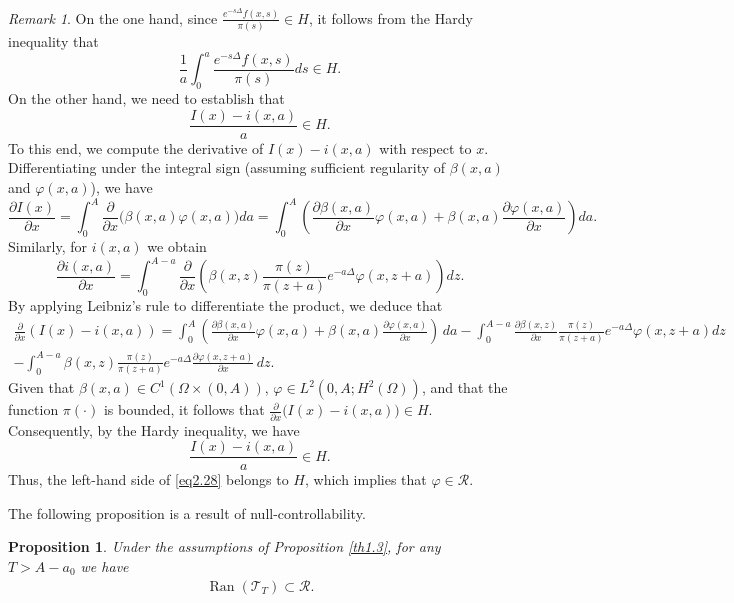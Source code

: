\documentclass[10pt, a4]{amsart}
\newcounter{assu}
\theoremstyle{plain}
\newtheorem{proposition}[lemma]{Proposition}
\theoremstyle{definition}
\theoremstyle{remark}
\newtheorem{remark}[lemma]{Remark}
\numberwithin{equation}{section}
\begin{document}
\begin{remark}
On the one hand, since \(\frac{e^{-s\Delta}f(x,s)}{\pi(s)} \in H\), it follows from the Hardy inequality \cite{ref43} that
\[
\frac{1}{a}\int_0^a \frac{e^{-s\Delta}f(x,s)}{\pi(s)}ds \in H.
\]
On the other hand, we need to establish that
\[
\frac{I(x)-i(x,a)}{a} \in H.
\]
To this end, we compute the derivative of \( I(x)-i(x,a) \) with respect to \(x\). Differentiating under the integral sign (assuming sufficient regularity of \(\beta(x,a)\) and \(\varphi(x,a)\)), we have
\[
\frac{\partial I(x)}{\partial x} = \int_0^A \frac{\partial}{\partial x}\bigl(\beta(x,a)\varphi(x,a)\bigr) da = \int_0^A \left(\frac{\partial \beta(x,a)}{\partial x}\varphi(x,a) + \beta(x,a)\frac{\partial \varphi(x,a)}{\partial x}\right) da.
\]
Similarly, for \( i(x,a) \) we obtain
\[
\frac{\partial i(x,a)}{\partial x} = \int_0^{A-a} \frac{\partial}{\partial x}\left(\beta(x,z)\frac{\pi(z)}{\pi(z+a)}e^{-a\Delta}\varphi(x,z+a)\right) dz.
\]
By applying Leibniz's rule to differentiate the product, we deduce that
\begin{align*}
    \frac{\partial}{\partial x} \left(I(x) - i(x, a)\right) = \int_{0}^{A} \left(\frac{\partial \beta(x, a)}{\partial x} \varphi(x, a) + \beta(x, a) \frac{\partial \varphi(x, a)}{\partial x}\right) \, da 
- \int_{0}^{A-a} \frac{\partial \beta(x, z)}{\partial x} \frac{\pi(z)}{\pi(z + a)} e^{-a\Delta} \varphi(x, z + a) dz\\
- \int_{0}^{A-a} \beta(x, z) \frac{\pi(z)}{\pi(z + a)} e^{-a\Delta} \frac{\partial \varphi(x, z + a)}{\partial x} \, dz.
\end{align*}
Given that \(\beta(x,a) \in C^1(\Omega \times (0,A))\), \(\varphi \in L^2(0,A; H^2(\Omega))\), and that the function \(\pi(\cdot)\) is bounded, it follows that \(\frac{\partial}{\partial x}\bigl(I(x)-i(x,a)\bigr) \in H\). Consequently, by the Hardy inequality, we have 
\[
\frac{I(x)-i(x,a)}{a} \in H.
\]
Thus, the left-hand side of \eqref{eq2.28} belongs to \(H\), which implies that \(\varphi \in \mathcal{R}\).
\end{remark}
The following proposition is a result of null-controllability.
 \begin{proposition}\label{pr2.5}
 Under the assumptions of Proposition \ref{th1.3}, for any $T>A-a_0$ we have 
 \begin{align}\label{eq2.31}
     \operatorname{Ran}( \mathcal{T}_T)\subset\mathcal{R}.
 \end{align} 
 \end{proposition}
\end{document}
